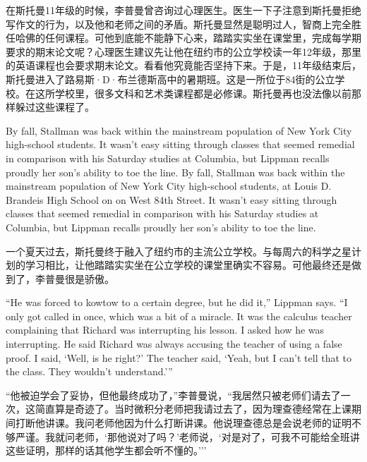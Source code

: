 \ifdefined\chs
在斯托曼11年级的时候，李普曼曾咨询过心理医生。医生一下子注意到斯托曼拒绝写作文的行为，以及他和老师之间的矛盾。斯托曼显然是聪明过人，智商上完全胜任哈佛的任何课程。可他到底能不能静下心来，踏踏实实坐在课堂里，完成每学期要求的期末论文呢？心理医生建议先让他在纽约市的公立学校读一年12年级，那里的英语课程也会要求期末论文。看看他究竟能否坚持下来。于是，11年级结束后，斯托曼进入了路易斯·D·布兰德斯高中的暑期班。这是一所位于84街的公立学校。在这所学校里，很多文科和艺术类课程都是必修课。斯托曼再也没法像以前那样躲过这些课程了。
\fi

\ifdefined\eng
\ifdefined\vone
By fall, Stallman was back within the mainstream population of New York City high-school students. It wasn't easy sitting through classes that seemed remedial in comparison with his Saturday studies at Columbia, but Lippman recalls proudly her son's ability to toe the line.
\fi
\ifdefined\vtwo
By fall, Stallman was back within the mainstream population of New York City high-school students, at Louis D. Brandeis High School on on West 84th Street. It wasn't easy sitting through classes that seemed remedial in comparison with his Saturday studies at Columbia, but Lippman recalls proudly her son's ability to toe the line.
\fi
\fi

\ifdefined\chs
一个夏天过去，斯托曼终于融入了纽约市的主流公立学校。与每周六的科学之星计划的学习相比，让他踏踏实实坐在公立学校的课堂里确实不容易。可他最终还是做到了，李普曼很是骄傲。
\fi

\ifdefined\eng
``He was forced to kowtow to a certain degree, but he did it,'' Lippman says. ``I only got called in once, which was a bit of a miracle. It was the calculus teacher complaining that Richard was interrupting his lesson. I asked how he was interrupting. He said Richard was always accusing the teacher of using a false proof. I said, `Well, is he right?' The teacher said, `Yeah, but I can't tell that to the class. They wouldn't understand.'\hspace{0.01in}''
\fi

\ifdefined\chs

``他被迫学会了妥协，但他最终成功了，''李普曼说，``我居然只被老师们请去了一次，这简直算是奇迹了。当时微积分老师把我请过去了，因为理查德经常在上课期间打断他讲课。我问老师他因为什么打断讲课。他说理查德总是会说老师的证明不够严谨。我就问老师，`那他说对了吗？'老师说，`对是对了，可我不可能给全班讲这些证明，那样的话其他学生都会听不懂的。'\hspace{0.01in}''
\fi

